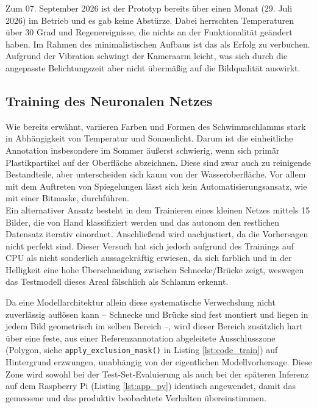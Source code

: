 Zum 07. September 2026 ist der Prototyp bereits über einen Monat (29. Juli 2026) im Betrieb und es gab keine Abstürze.
Dabei herrschten Temperaturen über 30 Grad und Regenereignisse, die nichts an der Funktionalität geändert haben.
Im Rahmen des minimalistischen Aufbaus ist das als Erfolg zu verbuchen. Aufgrund der Vibration schwingt der Kameraarm leicht, was sich durch die angepasste Belichtungszeit aber nicht übermäßig auf die Bildqualität auswirkt. 

\subsection{Training des Neuronalen Netzes}

Wie bereits erwähnt, variieren Farben und Formen des Schwimmschlamms stark in Abhängigkeit von Temperatur und Sonnenlicht. Darum ist die einheitliche Annotation insbesondere im Sommer äußerst schwierig, wenn sich primär Plastikpartikel auf der Oberfläche abzeichnen. Diese sind zwar auch zu reinigende Bestandteile, aber unterscheiden sich kaum von der Wasseroberfläche. Vor allem mit dem Auftreten von Spiegelungen lässt sich kein Automatisierungsansatz, wie mit einer Bitmaske, durchführen. \\

Ein alternativer Ansatz besteht in dem Trainieren eines kleinen Netzes mittels 15 Bilder, die von Hand klassifiziert werden und das autonom den restlichen Datensatz iterativ einordnet. Anschließend wird nachjustiert, da die Vorhersagen nicht perfekt sind. Dieser Versuch hat sich jedoch aufgrund des Trainings auf CPU als nicht sonderlich aussagekräftig erwiesen, da sich farblich und in der Helligkeit eine hohe Überschneidung zwischen Schnecke/Brücke zeigt, weswegen das Testmodell dieses Areal fälschlich als Schlamm erkennt.

Da eine Modellarchitektur allein diese systematische Verwechslung nicht zuverlässig auflösen kann -- Schnecke und Brücke sind fest montiert und liegen in jedem Bild geometrisch im selben Bereich --, wird dieser Bereich zusätzlich hart über eine feste, aus einer Referenzannotation abgeleitete Ausschlusszone (Polygon, siehe \texttt{apply\_exclusion\_mask()} in Listing \ref{lst:code_train}) auf Hintergrund erzwungen, unabhängig von der eigentlichen Modellvorhersage. Diese Zone wird sowohl bei der Test-Set-Evaluierung als auch bei der späteren Inferenz auf dem Raspberry Pi (Listing \ref{lst:app_py}) identisch angewendet, damit das gemessene und das produktiv beobachtete Verhalten übereinstimmen.


